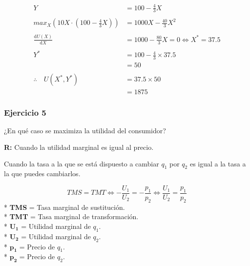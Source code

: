 \documentclass{templateNote}
\begin{document}
\begin{align*}
    Y &= 100 - \frac{4}{3}X \\
    \\
    max_{X} (10 X \cdot (100 - \frac{4}{3}X)) &= 1000X - \frac{40}{3} {X}^2 \\
    \\
    \frac{\mathrm{d} U(X)}{\mathrm{d}X} &= 1000 - \frac{80}{3}X = 0 \Leftrightarrow {X}^* = 37.5 \\
    \\
    {Y}^* &= 100 - \frac{4}{3} \times 37.5 \\
    &= 50 \\
    \\
    \therefore \quad U({X}^*, {Y}^*) &= 37.5 \times 50 \\
    &= 1875
\end{align*}

\subsubsection{Ejercicio 5}
\indent
¿En qué caso se maximiza la utilidad del consumidor?

\textbf{R:} Cuando la utilidad marginal es igual al precio.

Cuando la tasa a la que se está dispuesto a cambiar $q_1$ por $q_2$ es igual a la tasa a la que
puedes cambiarlos.

\begin{equation*}
    TMS = TMT \Leftrightarrow - \frac{U_1}{U_2} = - \frac{p_1}{p_2} \Leftrightarrow \frac{U_1}{U_2} = \frac{p_1}{p_2}
\end{equation*}
* \textbf{TMS} = Tasa marginal de sustitución.\\
* \textbf{TMT} = Tasa marginal de transformación.\\
* $\mathbf{U_1}$ = Utilidad marginal de $q_1$.\\
* $\mathbf{U_2}$ = Utilidad marginal de $q_2$.\\
* $\mathbf{p_1}$ = Precio de $q_1$.\\
* $\mathbf{p_2}$ = Precio de $q_2$.\\

\end{document}
